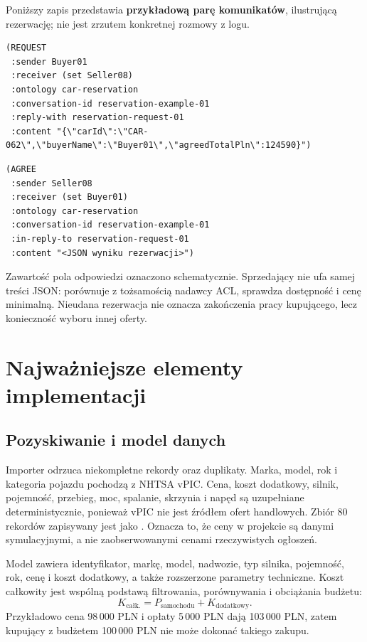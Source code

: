 \documentclass[a4paper,11pt]{uzreport}
\newcommand{\code}[1]{\texttt{\detokenize{#1}}}
\begin{document}
Poniższy zapis przedstawia \textbf{przykładową parę komunikatów},
ilustrującą rezerwację; nie jest zrzutem konkretnej rozmowy z logu.
\begin{lstlisting}[caption={Żądanie rezerwacji ACL i treść JSON}]
(REQUEST
 :sender Buyer01
 :receiver (set Seller08)
 :ontology car-reservation
 :conversation-id reservation-example-01
 :reply-with reservation-request-01
 :content "{\"carId\":\"CAR-062\",\"buyerName\":\"Buyer01\",\"agreedTotalPln\":124590}")
\end{lstlisting}
\begin{lstlisting}[caption={Odpowiedź powiązana z żądaniem}]
(AGREE
 :sender Seller08
 :receiver (set Buyer01)
 :ontology car-reservation
 :conversation-id reservation-example-01
 :in-reply-to reservation-request-01
 :content "<JSON wyniku rezerwacji>")
\end{lstlisting}
Zawartość pola odpowiedzi oznaczono schematycznie. Sprzedający nie ufa
samej treści JSON: porównuje \code{buyerName} z tożsamością nadawcy ACL,
sprawdza dostępność i cenę minimalną. Nieudana rezerwacja nie oznacza
zakończenia pracy kupującego, lecz konieczność wyboru innej oferty.

\section{Najważniejsze elementy implementacji}
\subsection{Pozyskiwanie i model danych}
Importer odrzuca niekompletne rekordy oraz duplikaty. Marka, model, rok
i kategoria pojazdu pochodzą z NHTSA vPIC. Cena, koszt dodatkowy,
silnik, pojemność, przebieg, moc, spalanie, skrzynia i napęd są uzupełniane
deterministycznie, ponieważ vPIC nie jest źródłem ofert handlowych.
Zbiór 80 rekordów zapisywany jest jako \code{data/cars.json}.
Oznacza to, że ceny w projekcie są danymi symulacyjnymi, a nie
zaobserwowanymi cenami rzeczywistych ogłoszeń.

Model zawiera identyfikator, markę, model, nadwozie, typ silnika,
pojemność, rok, cenę i koszt dodatkowy, a także rozszerzone parametry
techniczne. Koszt całkowity jest wspólną podstawą filtrowania,
porównywania i obciążania budżetu:
\[
K_{\text{całk.}}=P_{\text{samochodu}}+K_{\text{dodatkowy}}.
\]
Przykładowo cena 98\,000 PLN i opłaty 5\,000 PLN dają 103\,000 PLN,
zatem kupujący z budżetem 100\,000 PLN nie może dokonać takiego zakupu.
\end{document}
